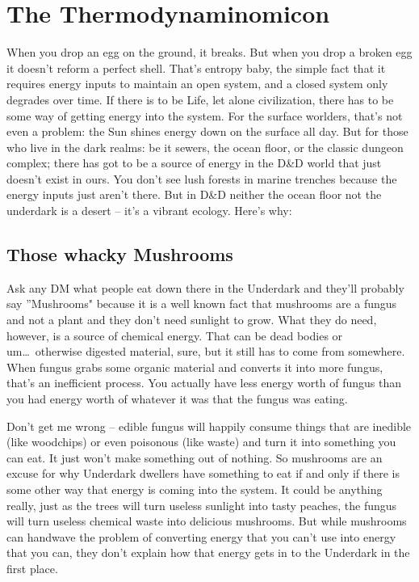 \section{The Thermodynaminomicon} %
\vspace*{-10pt}

When you drop an egg on the ground, it breaks. But when you drop a broken egg it doesn't reform a perfect shell. That's entropy baby, the simple fact that it requires energy inputs to maintain an open system, and a closed system only degrades over time. If there is to be Life, let alone civilization, there has to be some way of getting energy into the system. For the surface worlders, that's not even a problem: the Sun shines energy down on the surface all day. But for those who live in the dark realms: be it sewers, the ocean floor, or the classic dungeon complex; there has got to be a source of energy in the D\&D world that just doesn't exist in ours. You don't see lush forests in marine trenches because the energy inputs just aren't there. But in D\&D neither the ocean floor not the underdark is a desert -- it's a vibrant ecology. Here's why:

\subsection{Those whacky Mushrooms}

Ask any DM what people eat down there in the Underdark and they'll probably say ''Mushrooms" because it is a well known fact that mushrooms are a fungus and not a plant and they don't need sunlight to grow. What they do need, however, is a source of chemical energy. That can be dead bodies or um\ldots\  otherwise digested material, sure, but it still has to come from somewhere. When fungus grabs some organic material and converts it into more fungus, that's an inefficient process. You actually have less energy worth of fungus than you had energy worth of whatever it was that the fungus was eating.

Don't get me wrong -- edible fungus will happily consume things that are inedible (like woodchips) or even poisonous (like waste) and turn it into something you can eat. It just won't make something out of nothing. So mushrooms are an excuse for why Underdark dwellers have something to eat if and only if there is some other way that energy is coming into the system. It could be anything really, just as the trees will turn useless sunlight into tasty peaches, the fungus will turn useless chemical waste into delicious mushrooms. But while mushrooms can handwave the problem of converting energy that you can't use into energy that you can, they don't explain how that energy gets in to the Underdark in the first place.

